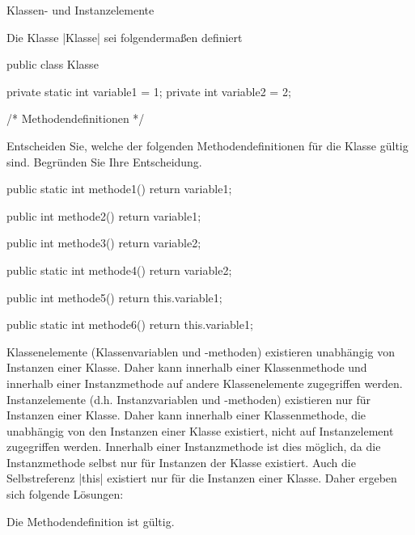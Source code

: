 
\begin{exercise}{Klassen- und Instanzelemente}
\begin{body}
Die Klasse \code|Klasse| sei folgendermaßen definiert
\medskip
\begin{displaycode}
public class Klasse {
    private static int variable1 = 1;
    private int variable2 = 2;
    
    /* Methodendefinitionen */ 
}
\end{displaycode}
\medskip
Entscheiden Sie, welche der folgenden Methodendefinitionen für die Klasse gültig sind. Begründen Sie Ihre Entscheidung.
\medskip
\begin{parts}
\item
\begin{displaycode}
    public static int methode1() {
        return variable1;
    }
\end{displaycode}

\item
\begin{displaycode}
    public int methode2() {
        return variable1;
    }
\end{displaycode}

\item
\begin{displaycode}
    public int methode3() {
        return variable2;
    }
\end{displaycode}

\item
\begin{displaycode}
    public static int methode4() {
        return variable2;
    }
\end{displaycode}

\item
\begin{displaycode}
    public int methode5() {
        return this.variable1;
    }
\end{displaycode}

\item
\begin{displaycode}
    public static int methode6() {
        return this.variable1;
    }
\end{displaycode}
\end{parts}
\end{body}


\begin{solution}
Klassenelemente (Klassenvariablen und -methoden) existieren unabhängig von Instanzen einer Klasse. Daher kann innerhalb einer Klassenmethode und innerhalb einer Instanzmethode auf andere Klassenelemente zugegriffen werden. Instanzelemente (d.h. Instanzvariablen und -methoden) existieren nur für Instanzen einer Klasse. Daher kann innerhalb einer Klassenmethode, die unabhängig von den Instanzen einer Klasse existiert, nicht auf Instanzelement zugegriffen werden. Innerhalb einer Instanzmethode ist dies möglich, da die Instanzmethode selbst nur für Instanzen der Klasse existiert. Auch die Selbstreferenz \code|this| existiert nur für die Instanzen einer Klasse. Daher ergeben sich folgende Lösungen:
\begin{parts}
\item
Die Methodendefinition ist gültig.


\end{parts}
\end{solution}
\end{exercise}
